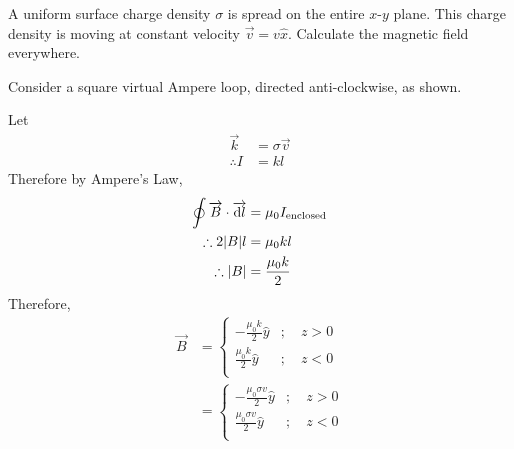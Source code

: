 \documentclass[fleqn, a4paper, 12pt, twoside]{article}
\theoremstyle{definition}
\theoremstyle{theorem}
\begin{document}
\addtocounter{question}{1}

\begin{question}
	A uniform surface charge density $\sigma$ is spread on the entire $x$-$y$ plane.
	This charge density is moving at constant velocity $\overrightarrow{v} = v \hat{x}$.
	Calculate the magnetic field everywhere.
\end{question}

\begin{solution}
	Consider a square virtual Ampere loop, directed anti-clockwise, as shown.
	\begin{figure}[H]
	\end{figure}
	Let
	\begin{align*}
		\overrightarrow{k} & = \sigma \overrightarrow{v}\\
		\therefore I       & = k l
	\end{align*}
	Therefore by Ampere's Law,
	\begin{align*}
		\oint \overrightarrow{B} \cdot \overrightarrow{\dif l} & = \mu_0 I_{\textnormal{enclosed}} \\
		\therefore 2 |B| l                                     & = \mu_0 k l                       \\
		\therefore |B|                                         & = \frac{\mu_0 k}{2}
	\end{align*}
	Therefore,
	\begin{align*}
		\overrightarrow{B} &=
			\begin{cases}
				-\frac{\mu_0 k}{2} \hat{y} & ;\quad z > 0 \\
				\frac{\mu_0 k}{2} \hat{y}  & ;\quad z < 0 \\
			\end{cases}\\
		&=
			\begin{cases}
				-\frac{\mu_0 \sigma v}{2} \hat{y} & ;\quad z > 0 \\
				\frac{\mu_0 \sigma v}{2} \hat{y}  & ;\quad z < 0 \\
			\end{cases}
	\end{align*}
\end{solution}
\end{document}
